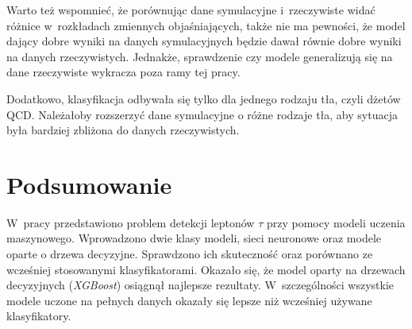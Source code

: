 \documentclass{pracalicmgr}
\begin{document}
	Warto też wspomnieć, że porównując dane symulacyjne i~rzeczywiste widać różnice w~rozkładach zmiennych objaśniających, także nie ma pewności, że model dający dobre wyniki na danych symulacyjnych będzie dawał równie dobre wyniki na danych rzeczywistych. Jednakże, sprawdzenie czy modele generalizują się na dane rzeczywiste wykracza poza ramy tej pracy.
	
	Dodatkowo, klasyfikacja odbywała się tylko dla jednego rodzaju tła, czyli dżetów QCD. Należałoby rozszerzyć dane symulacyjne o różne rodzaje tła, aby sytuacja była bardziej zbliżona do danych rzeczywistych.
	
    \chapter{Podsumowanie}
    
	W~pracy przedstawiono problem detekcji leptonów $\tau$ przy pomocy modeli uczenia maszynowego. Wprowadzono dwie klasy modeli, sieci neuronowe oraz modele oparte o drzewa decyzyjne. Sprawdzono ich skuteczność oraz porównano ze wcześniej stosowanymi klasyfikatorami. Okazało się, że model oparty na drzewach decyzyjnych (\textit{XGBoost}) osiągnął najlepsze rezultaty. W~szczególności wszystkie modele uczone na pełnych danych okazały się lepsze niż wcześniej używane klasyfikatory.
    
    \printbibliography[title={Bibliografia}]
    
\end{document}
